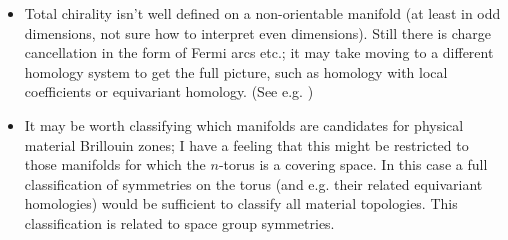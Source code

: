 {\begin{itemize}
	On a non-orientable manifold, this argument doesn't hold since the integral over $B'$ isn't well defined.
	
	\item Total chirality isn't well defined on a non-orientable manifold (at least in odd dimensions, not sure how to interpret even dimensions). Still there is charge cancellation in the form of Fermi arcs etc.; it may take moving to a different homology system to get the full picture, such as homology with local coefficients or equivariant homology. (See e.g. \cite{Thiang_equivariant})
	
	\item It may be worth classifying which manifolds are candidates for physical material Brillouin zones; I have a feeling that this might be restricted to those manifolds for which the $n$-torus is a covering space. In this case a full classification of symmetries on the torus (and e.g. their related equivariant homologies) would be sufficient to classify all material topologies. This classification is related to space group symmetries.
\end{itemize}
}  %